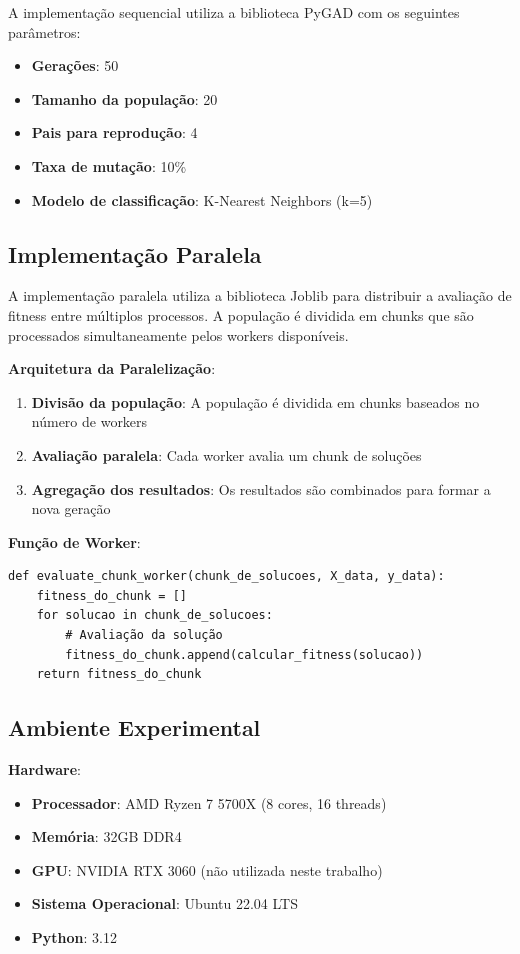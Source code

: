 \documentclass[12pt,a4paper]{article}
\begin{document}
A implementação sequencial utiliza a biblioteca PyGAD com os seguintes parâmetros:
\begin{itemize}
    \item \textbf{Gerações}: 50
    \item \textbf{Tamanho da população}: 20
    \item \textbf{Pais para reprodução}: 4
    \item \textbf{Taxa de mutação}: 10\%
    \item \textbf{Modelo de classificação}: K-Nearest Neighbors (k=5)
\end{itemize}

\subsection{Implementação Paralela}

A implementação paralela utiliza a biblioteca Joblib para distribuir a avaliação de fitness entre múltiplos processos. A população é dividida em chunks que são processados simultaneamente pelos workers disponíveis.

\textbf{Arquitetura da Paralelização}:
\begin{enumerate}
    \item \textbf{Divisão da população}: A população é dividida em chunks baseados no número de workers
    \item \textbf{Avaliação paralela}: Cada worker avalia um chunk de soluções
    \item \textbf{Agregação dos resultados}: Os resultados são combinados para formar a nova geração
\end{enumerate}

\textbf{Função de Worker}:
\begin{verbatim}
def evaluate_chunk_worker(chunk_de_solucoes, X_data, y_data):
    fitness_do_chunk = []
    for solucao in chunk_de_solucoes:
        # Avaliação da solução
        fitness_do_chunk.append(calcular_fitness(solucao))
    return fitness_do_chunk
\end{verbatim}

\subsection{Ambiente Experimental}

\textbf{Hardware}:
\begin{itemize}
    \item \textbf{Processador}: AMD Ryzen 7 5700X (8 cores, 16 threads)
    \item \textbf{Memória}: 32GB DDR4
    \item \textbf{GPU}: NVIDIA RTX 3060 (não utilizada neste trabalho)
    \item \textbf{Sistema Operacional}: Ubuntu 22.04 LTS
    \item \textbf{Python}: 3.12
\end{itemize}
\end{document}
